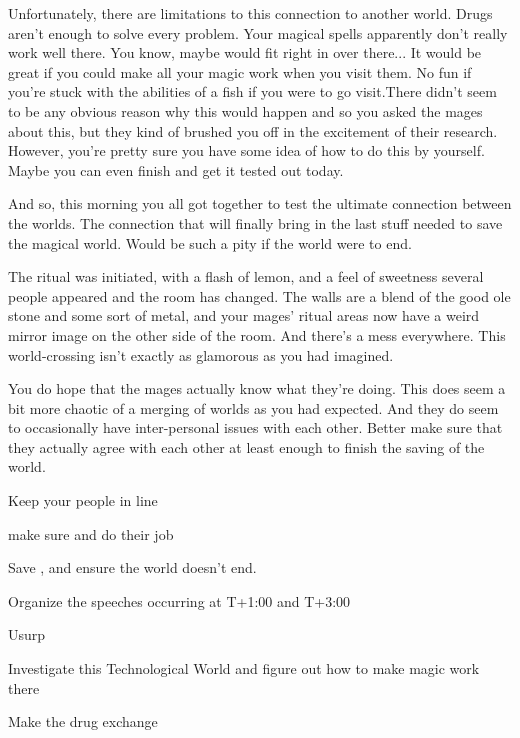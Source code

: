 \documentclass[char]{guildcamp3}
\begin{document}
Unfortunately, there are limitations to this connection to another world. Drugs aren't enough to solve every problem. Your magical spells apparently don't really work well there. You know, maybe \cNobleOne{} would fit right in over there... It would be great if you could make all your magic work when you visit them. No fun if you're stuck with the abilities of a fish if you were to go visit.There didn't seem to be any obvious reason why this would happen and so you asked the mages about this, but they kind of brushed you off in the excitement of their research. However, you're pretty sure you have some idea of how to do this by yourself. Maybe you can even finish and get it tested out today. 

And so, this morning you all got together to test the ultimate connection between the worlds. The connection that will finally bring in the last stuff needed to save the magical world. Would be such a pity if the world were to end. 

The ritual was initiated, with a flash of lemon, and a feel of sweetness several people appeared and the room has changed. The walls are a blend of the good ole stone and some sort of metal, and your mages' ritual areas now have a weird mirror image on the other side of the room. And there's a mess everywhere. This world-crossing isn't exactly as glamorous as you had imagined. 

You do hope that the mages actually know what they're doing. This does seem a bit more chaotic of a merging of worlds as you had expected. And they do seem to occasionally have inter-personal issues with each other. Better make sure that they actually agree with each other at least enough to finish the saving of the world. 


\begin{itemz}[Goals]
  \item Keep your people in line
  \item make sure \cMageOne{\intro} and \cMageTwo{\intro} do their job
  \item Save \bMagicWorld{}, and ensure the world doesn't end. 
  \item Organize the speeches occurring at T+1:00 and T+3:00
  \item Usurp \cNobleOne{\intro}
  \item Investigate this Technological World and figure out how to make magic work there
  \item Make the drug exchange
\end{itemz}
\end{document}
